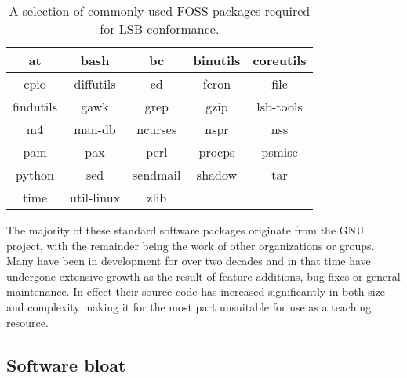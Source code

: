 \begin{table}
    \begin{center}
        \begin{tabular}{|c|c|c|c|c|}
            \hline
            at & bash & bc & binutils & coreutils \\
            \hline
            cpio & diffutils & ed & fcron & file \\
            \hline
            findutils & gawk & grep & gzip & lsb-tools \\
            \hline
            m4 & man-db & ncurses & nspr & nss \\
            \hline
            pam & pax & perl & procps & psmisc \\
            \hline
            python & sed & sendmail & shadow & tar \\
            \hline
            time  & util-linux & zlib \\
            \cline{1-3}
        \end{tabular}
        \caption{A selection of commonly used FOSS packages required for LSB conformance.}
    \end{center}
\end{table}

The majority of these standard software packages originate from the GNU project, with the remainder being the work of other organizations or groups. Many have been in development for over two decades and in that time have undergone extensive growth as the result of feature additions, bug fixes or general maintenance. In effect their source code has increased significantly in both size and complexity making it for the most part unsuitable for use as a teaching resource.

\subsection{Software bloat}

